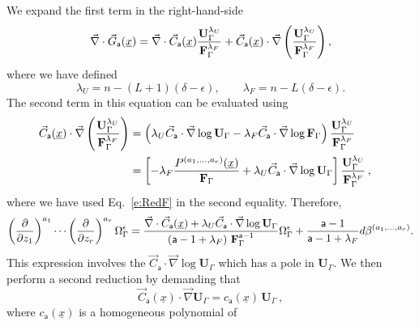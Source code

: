 \documentclass[a4paper,12pt]{article}
\numberwithin{equation}{section}
\numberwithin{figure}{section}
\begin{document}
We expand the first term in the right-hand-side
\begin{equation}
  \vec\nabla \cdot \vec G_{\mathsf{a}}(\underline x)=  \vec\nabla \cdot \vec C_{\mathsf{a}}(\underline x) {\textbf{U}_\Gamma^{\lambda_U}\over
  \textbf{F}_\Gamma^{\lambda_F}} 
+
  \vec C_{\mathsf{a}}(\underline x) \cdot\vec\nabla  \left(   {\textbf{U}_\Gamma^{\lambda_U}\over
  \textbf{F}_\Gamma^{\lambda_F}} \right),
\end{equation}
where we have defined
\begin{equation}\label{e:powerUFDef}
  \lambda_U=n-(L+1)(\delta-\epsilon), \qquad 
  \lambda_F=n-L(\delta-\epsilon).
  \end{equation}
%
The second term in this equation can be evaluated using 
\begin{align}
  \vec C_{\mathsf{a}}(\underline x)\cdot \vec\nabla \left(\mathbf{U}_\Gamma^{\lambda_U}\over
\mathbf{F}_\Gamma^{\lambda_F}\right)&=\left(\lambda_U \vec
C_{\mathsf{a}}\cdot \vec\nabla \log\mathbf{U}_\Gamma -{\lambda_F} \vec
C_{\mathsf{a}}\cdot \vec\nabla \log \mathbf{F}_\Gamma\right) {\mathbf{U}_\Gamma^{\lambda_U}\over
\mathbf{F}_\Gamma^{\lambda_F}} \cr
&=\left[-{\lambda_F}{
    P^{(a_1,\dots,a_r)}(\underline x)\over
  \mathbf{F}_\Gamma}   
+
 \lambda_U \vec
C_{\mathsf{a}}\cdot \vec\nabla \log\mathbf{U}_\Gamma \right] {\mathbf{U}_\Gamma^{\lambda_U}\over
	\mathbf{F}_\Gamma^{\lambda_F}}\,,
\end{align}
where we have used Eq.~\eqref{e:RedF} in the second equality. Therefore, 
\begin{equation}
	\label{e:Pred}
\left(\partial\over \partial z_1\right)^{a_1}\cdots\left(\partial
  \over\partial z_r\right)^{a_r} \Omega_\Gamma^\epsilon={
\vec\nabla \cdot \vec C_{\mathsf{a}}
     (\underline x)
+ \lambda_U \vec
    C_{\mathsf{a}}\cdot\vec\nabla\log\mathbf{U}_\Gamma\over \left(\mathsf{a}-1+\lambda_F\right)\,\textbf{F}_\Gamma^{\mathsf{a}-1}}
  \Omega_\Gamma^\epsilon
+{  \mathsf{a}-1 \over \mathsf{a}-1+\lambda_F} d\beta^{(a_1,\dots,a_r)}.
\end{equation}
%
This expression involves the $\vec
    C_{\mathsf{a}}\cdot\vec\nabla\log\mathbf{U}_\Gamma$ which has a
    pole in $\mathbf{U}_\Gamma$. We then perform a second reduction by demanding that
    \begin{equation}
      \label{e:RedU}
      \vec
    C_{\mathsf{a}}(\underline x)\cdot\vec\nabla \mathbf{U}_\Gamma =
    c_{\mathsf{a}}(\underline x) \, \mathbf{U}_\Gamma \, ,
    \end{equation}
where $ c_{\mathsf{a}}(\underline x)$ is a homogeneous polynomial of
\end{document}
